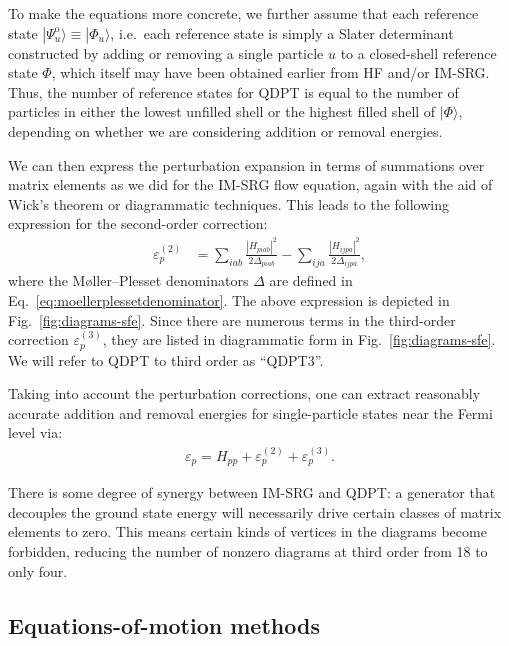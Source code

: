 \documentclass[aip, jcp, 12pt]{revtex4-1}
\newcommand{\ket}[1]{| #1 \rangle}
\begin{document}
To make the equations more concrete, we further assume that each reference state $\ket{\Psi^{\mathrm{o}}_u} \equiv \ket{\Phi_u}$, i.e.\ each reference state is simply a Slater determinant constructed by adding or removing a single particle $u$ to a closed-shell reference state $\Phi$, which itself may have been obtained earlier from HF and/or IM-SRG.  Thus, the number of reference states for QDPT is equal to the number of particles in either the lowest unfilled shell or the highest filled shell of $\ket{\Phi}$, depending on whether we are considering addition or removal energies.

We can then express the perturbation expansion in terms of summations over matrix elements as we did for the IM-SRG flow equation, again with the aid of Wick's theorem or diagrammatic techniques.  This leads to the following expression for the second-order correction:
\begin{align*}
  \varepsilon_p^{(2)}
  &=
    \sum_{i a b} \frac{|H_{p i a b}|^2}{2 \Delta_{p i a b}}
    - \sum_{i j a} \frac{|H_{i j p a}|^2}{2 \Delta_{i j p a}},
\end{align*}
where the M\o ller--Plesset denominators $\Delta$ are defined in Eq.\ \eqref{eq:moellerplessetdenominator}.  The above expression is depicted in Fig.\ \ref{fig:diagrams-sfe}.  Since there are numerous terms in the third-order correction $\varepsilon_p^{(3)}$, they are listed in diagrammatic form in Fig.\ \ref{fig:diagrams-sfe}.  We will refer to QDPT to third order as ``QDPT3''.

Taking into account the perturbation corrections, one can extract reasonably accurate addition and removal energies for single-particle states near the Fermi level via:
\begin{align*}
  \varepsilon_p = H_{p p} + \varepsilon_p^{(2)} + \varepsilon_p^{(3)}.
\end{align*}

There is some degree of synergy between IM-SRG and QDPT: a generator that decouples the ground state energy will necessarily drive certain classes of matrix elements to zero.  This means certain kinds of vertices in the diagrams become forbidden, reducing the number of nonzero diagrams at third order from 18 to only four.

\subsection{Equations-of-motion methods}
\end{document}
